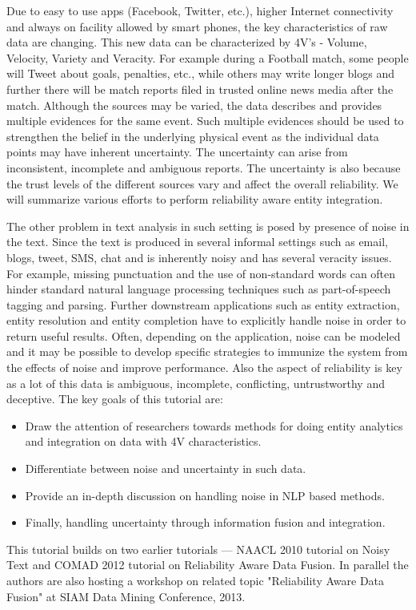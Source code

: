 \noindent
Due to easy to use apps (Facebook, Twitter, etc.), higher Internet connectivity and always on facility allowed by smart phones, the key characteristics of raw data are changing. This new data can be characterized by 4V's - Volume, Velocity, Variety and Veracity. For example during a Football match, some people will Tweet about goals, penalties, etc., while others may write longer blogs and further there will be match reports filed in trusted online news media after the match. Although the sources may be varied, the data describes and provides multiple evidences for the same event. Such multiple evidences should be used to strengthen the belief in the underlying physical event as the individual data points may have inherent uncertainty. The uncertainty can arise from inconsistent, incomplete and ambiguous reports. The uncertainty is also because the trust levels of the different sources vary and affect the overall reliability. We will summarize various efforts to perform reliability aware entity integration.

The other problem in text analysis in such setting is posed by presence of noise in the text. Since the text is produced in several informal settings such as email, blogs, tweet, SMS, chat and is inherently noisy and has several veracity issues. For example, missing punctuation and the use of non-standard words can often hinder standard natural language processing techniques such as part-of-speech tagging and parsing. Further downstream applications such as entity extraction, entity resolution and entity completion have to explicitly handle noise in order to return useful results. Often, depending on the application, noise can be modeled and it may be possible to develop specific strategies to immunize the system from the effects of noise and improve performance. Also the aspect of reliability is key as a lot of this data is ambiguous, incomplete, conflicting, untrustworthy and deceptive. The key goals of this tutorial are:

\begin{itemize}
\item Draw the attention of researchers towards methods for doing entity analytics and integration on data with 4V characteristics.
\item Differentiate between noise and uncertainty in such data.
\item Provide an in-depth discussion on handling noise in NLP based methods.
\item Finally, handling uncertainty through information fusion and integration.
\end{itemize}

This tutorial builds on two earlier tutorials — NAACL 2010 tutorial on Noisy Text and COMAD 2012 tutorial on Reliability Aware Data Fusion. In parallel the authors are also hosting a workshop on related topic "Reliability Aware Data Fusion" at SIAM Data Mining Conference, 2013.
